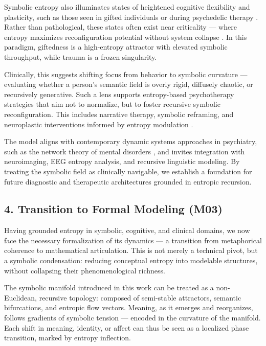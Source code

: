 Symbolic entropy also illuminates states of heightened cognitive flexibility and plasticity, such as those seen in gifted individuals or during psychedelic therapy \cite{muthukumaraswamy2013broadband}. Rather than pathological, these states often exist near criticality — where entropy maximizes reconfiguration potential without system collapse \cite{kelso1995dynamic}. In this paradigm, giftedness is a high-entropy attractor with elevated symbolic throughput, while trauma is a frozen singularity.

Clinically, this suggests shifting focus from behavior to symbolic curvature — evaluating whether a person’s semantic field is overly rigid, diffusely chaotic, or recursively generative. Such a lens supports entropy-based psychotherapy strategies that aim not to normalize, but to foster recursive symbolic reconfiguration. This includes narrative therapy, symbolic reframing, and neuroplastic interventions informed by entropy modulation \cite{gallagher2020action, solms2021hidden}.

The model aligns with contemporary dynamic systems approaches in psychiatry, such as the network theory of mental disorders \cite{borsboom2017network}, and invites integration with neuroimaging, EEG entropy analysis, and recursive linguistic modeling. By treating the symbolic field as clinically navigable, we establish a foundation for future diagnostic and therapeutic architectures grounded in entropic recursion.

\subsection*{4. Transition to Formal Modeling (M03)}

Having grounded entropy in symbolic, cognitive, and clinical domains, we now face the necessary formalization of its dynamics — a transition from metaphorical coherence to mathematical articulation. This is not merely a technical pivot, but a symbolic condensation: reducing conceptual entropy into modelable structures, without collapsing their phenomenological richness.

The symbolic manifold introduced in this work can be treated as a non-Euclidean, recursive topology: composed of semi-stable attractors, semantic bifurcations, and entropic flow vectors. Meaning, as it emerges and reorganizes, follows gradients of symbolic tension — encoded in the curvature of the manifold. Each shift in meaning, identity, or affect can thus be seen as a localized phase transition, marked by entropy inflection.

